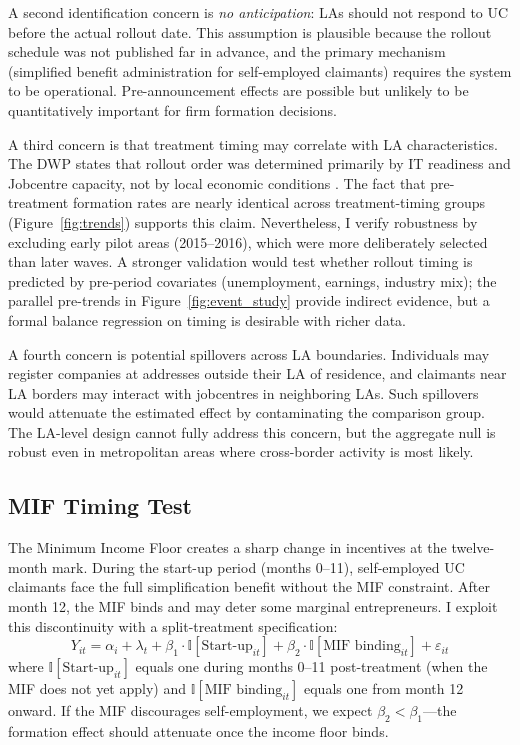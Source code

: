 \documentclass[12pt]{article}
\newcommand{\ind}{\mathbb{I}}
\begin{document}
A second identification concern is \textit{no anticipation}: LAs should not respond to UC before the actual rollout date. This assumption is plausible because the rollout schedule was not published far in advance, and the primary mechanism (simplified benefit administration for self-employed claimants) requires the system to be operational. Pre-announcement effects are possible but unlikely to be quantitatively important for firm formation decisions.

A third concern is that treatment timing may correlate with LA characteristics. The DWP states that rollout order was determined primarily by IT readiness and Jobcentre capacity, not by local economic conditions \citep{dwp2018rollout}. The fact that pre-treatment formation rates are nearly identical across treatment-timing groups (Figure~\ref{fig:trends}) supports this claim. Nevertheless, I verify robustness by excluding early pilot areas (2015--2016), which were more deliberately selected than later waves. A stronger validation would test whether rollout timing is predicted by pre-period covariates (unemployment, earnings, industry mix); the parallel pre-trends in Figure~\ref{fig:event_study} provide indirect evidence, but a formal balance regression on timing is desirable with richer data.

A fourth concern is potential spillovers across LA boundaries. Individuals may register companies at addresses outside their LA of residence, and claimants near LA borders may interact with jobcentres in neighboring LAs. Such spillovers would attenuate the estimated effect by contaminating the comparison group. The LA-level design cannot fully address this concern, but the aggregate null is robust even in metropolitan areas where cross-border activity is most likely.

\subsection{MIF Timing Test}

The Minimum Income Floor creates a sharp change in incentives at the twelve-month mark. During the start-up period (months 0--11), self-employed UC claimants face the full simplification benefit without the MIF constraint. After month 12, the MIF binds and may deter some marginal entrepreneurs. I exploit this discontinuity with a split-treatment specification:
\begin{equation}
Y_{it} = \alpha_i + \lambda_t + \beta_1 \cdot \ind[\text{Start-up}_{it}] + \beta_2 \cdot \ind[\text{MIF binding}_{it}] + \varepsilon_{it}
\end{equation}
where $\ind[\text{Start-up}_{it}]$ equals one during months 0--11 post-treatment (when the MIF does not yet apply) and $\ind[\text{MIF binding}_{it}]$ equals one from month 12 onward. If the MIF discourages self-employment, we expect $\beta_2 < \beta_1$---the formation effect should attenuate once the income floor binds.
\end{document}
